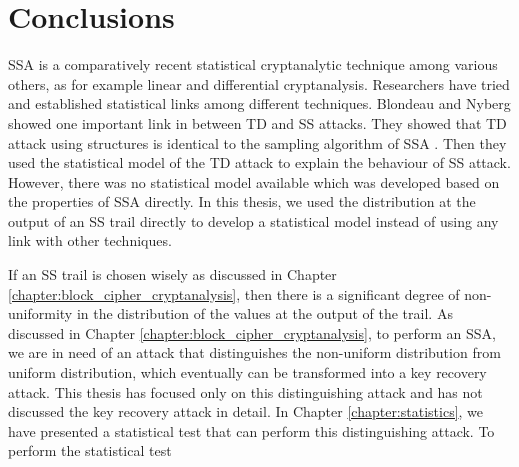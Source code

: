 \chapter{Conclusions}
\label{chapter:conclusions}
SSA is a comparatively recent statistical cryptanalytic technique among various others, as for example linear and differential cryptanalysis. Researchers have tried and established statistical links among different techniques. Blondeau and Nyberg showed one important link in between TD and SS attacks. They showed that TD attack using structures is identical to the sampling algorithm of SSA \citep{Celine_Kaisa_Links_2014}. Then they used the statistical model of the TD attack to explain the behaviour of SS attack. However, there was no statistical model available which was developed based on the properties of SSA directly. In this thesis, we used the distribution at the output of an SS trail directly to develop a statistical model instead of using any link with other techniques. \par \noindent If an SS trail is chosen wisely as discussed in Chapter \ref{chapter:block_cipher_cryptanalysis}, then there is a significant degree of non-uniformity in the distribution of the values at the output of the trail. %
As discussed in Chapter \ref{chapter:block_cipher_cryptanalysis}, to perform an SSA, we are in need of an attack that distinguishes the non-uniform distribution from uniform distribution, which eventually can be transformed into a key recovery attack. This thesis has focused only on this distinguishing attack and has not discussed the key recovery attack in detail. In Chapter \ref{chapter:statistics}, we have presented a statistical test that can perform this distinguishing attack. To perform the statistical test %
